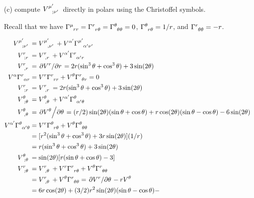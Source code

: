 \documentclass[gr-notes.tex]{subfiles}
\begin{document}
(c) compute $\tensor{V}{^{\mu'}_{;\nu'}}$ directly in polars using the Christoffel symbols.

Recall that we have $\tensor{\Gamma}{^\mu_{rr}} = \tensor{\Gamma}{^r_{r\theta}} = \tensor{\Gamma}{^\theta_{\theta\theta}} = 0$, $\tensor{\Gamma}{^\theta_{r\theta}} = 1/r$, and $\tensor{\Gamma}{^r_{\theta\theta}} = -r$.

\begin{align*}
  \tensor{V}{^{\mu'}_{;\nu'}} &=
  \tensor{V}{^{\mu'}_{,\nu'}} +
  \tensor{V}{^{\alpha'}} \tensor{\Gamma}{^{\mu'}_{\alpha'\nu'}}
  \\
  \tensor{V}{^r_{;r}} &=
  \tensor{V}{^r_{,r}} +
  \tensor{V}{^{\alpha'}} \tensor{\Gamma}{^r_{\alpha'r}}
  \\
  \tensor{V}{^r_{,r}} &=
  \pdv*{V^r}{r} =
  2 r (\sin^3\theta + \cos^3\theta) + 3 \sin(2\theta)
  \\
  \tensor{V}{^\alpha} \tensor{\Gamma}{^r_{\alpha r}} &=
  V^r     \tensor{\Gamma}{^r_{rr}} +
  V^\theta \tensor{\Gamma}{^r_{\theta r}} =
  0
  \\
  \tensor{V}{^r_{;r}} &=
  \tensor{V}{^r_{,r}} =
  2 r (\sin^3\theta + \cos^3\theta) + 3 \sin(2\theta)
  \\
  \tensor{V}{^\theta_{;\theta}} &=
  \tensor{V}{^\theta_{,\theta}} +
  \tensor{V}{^{\alpha'}} \tensor{\Gamma}{^\theta_{\alpha'\theta}}
  \\
  \tensor{V}{^\theta_{,\theta}} &=
  \pdv*{V^\theta}{\theta} =
  (r/2) \sin(2\theta) (\sin\theta + \cos\theta) +
  r \cos(2\theta) (\sin\theta - \cos\theta) -
  6 \sin(2\theta)
  \\
  \tensor{V}{^{\alpha'}} \tensor{\Gamma}{^\theta_{\alpha'\theta}} &=
  \tensor{V}{^r} \tensor{\Gamma}{^\theta_{r\theta}} +
  \tensor{V}{^\theta} \tensor{\Gamma}{^\theta_{\theta\theta}}
  \\ &=
  [r^2 (\sin^3\theta + \cos^3\theta) + 3r \sin(2\theta)] (1/r)
  \\ &=
  r (\sin^3\theta + \cos^3\theta) + 3 \sin(2\theta)
  \\
  \tensor{V}{^\theta_{;\theta}} &=
  \sin(2\theta) [r (\sin\theta + \cos\theta) - 3]
  \\
  \tensor{V}{^r_{;\theta}} &=
  \tensor{V}{^r_{,\theta}} +
  V^r \tensor{\Gamma}{^r_{r\theta}} +
  V^\theta \tensor{\Gamma}{^r_{\theta\theta}}
  \\ &=
  \tensor{V}{^r_{,\theta}} +
  V^\theta \tensor{\Gamma}{^r_{\theta\theta}} =
  \pdv*{V^r}{\theta} - r V^\theta
  \\ &=
  6 r \cos(2\theta) +
  (3/2) r^2 \sin(2\theta) (\sin\theta-\cos\theta) -

\end{align*}
\end{document}
